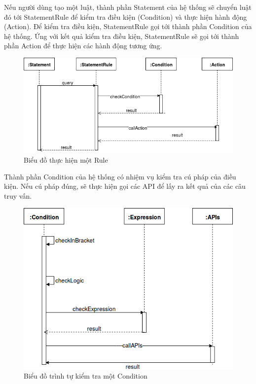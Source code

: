 Nếu người dùng tạo một luật, thành phần Statement của hệ thống sẽ chuyển luật đó tới StatementRule để kiểm tra điều kiện (Condition) và thực hiện hành động (Action). Để kiểm tra điều kiện, StatementRule gọi tới thành phần Condition của hệ thống. Ứng với kết quả kiểm tra điều kiện, StatementRule sẽ gọi tới thành phần Action để thực hiện các hành động tương ứng.

\begin{figure}[h!]
	\center
	\includegraphics[scale=0.4]{image/language_diagram-statement_rule}	
	\caption{Biểu đồ thực hiện một Rule}
\end{figure}

Thành phần Condition của hệ thống có nhiệm vụ kiểm tra cú pháp của điều kiện. Nếu cú pháp đúng, sẽ thực hiện gọi các API để lấy ra kết quả của các câu truy vấn. 

\begin{figure}[h!]
	\center
	\includegraphics[scale=0.4]{image/language_diagram-condition}	
	\caption{Biểu đồ trình tự kiểm tra một Condition}
\end{figure}


